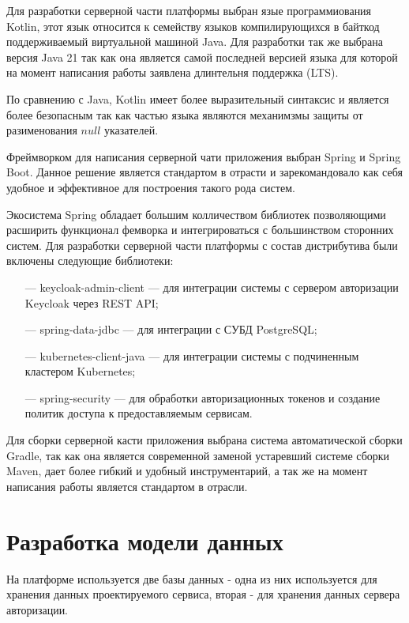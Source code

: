 Для разработки серверной части платформы выбран язые программиования Kotlin, этот язык относится к семейству языков компилирующихся в байткод поддерживаемый виртуальной машиной Java. Для разработки так же выбрана версия Java 21 так как она является самой последней версией языка для которой на момент написания работы заявлена длинтельня поддержка (LTS).

По сравнению с Java, Kotlin имеет более выразительный синтаксис и является более безопасным так как частью языка являются механимзмы защиты от разименования $null$ указателей\cite{samuel2017programming}.

Фреймворком для написания серверной чати приложения выбран Spring и Spring Boot.
Данное решение является стандартом в отрасти и зарекомандовало как себя удобное и эффективное для построения такого рода систем.

Экосистема Spring обладает большим колличеством библиотек позволяющими расширить функционал фемворка и интегрироваться с большинством сторонних систем.
Для разработки серверной части платформы с состав дистрибутива были включены следующие библиотеки:

\begin{itemize}
  \item[---]keycloak-admin-client --- для интеграции системы с сервером авторизации Keycloak через REST API;
  \item[---]spring-data-jdbc --- для интеграции с СУБД PostgreSQL;
  \item[---]kubernetes-client-java --- для интеграции системы с подчиненным кластером Kubernetes;
  \item[---]spring-security --- для обработки авторизационных токенов и создание политик доступа к предоставляемым сервисам.
\end{itemize}

Для сборки серверной касти приложения выбрана система автоматической сборки Gradle, так как она является современной заменой устаревший системе сборки Maven, дает более гибкий и удобный инструментарий, а так же на момент написания работы является стандартом в отрасли. 

\section{Разработка модели данных}

На платформе используется две базы данных - одна из них используется для хранения данных проектируемого сервиса, вторая - для хранения данных сервера авторизации.

